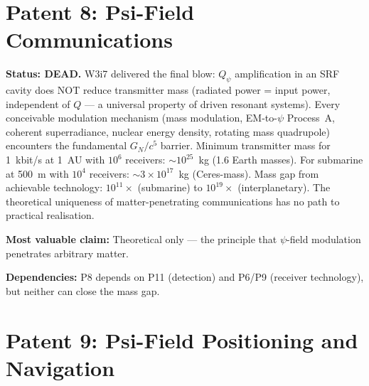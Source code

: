 \documentclass[11pt]{article}
\newcommand{\ee}[1]{\times 10^{#1}}
\begin{document}
\section{Patent 8: Psi-Field Communications}
\label{sec:P8}

\begin{tcolorbox}[colback=red!5!white, colframe=red!60!black,
  title=\textbf{P8: DEAD --- Resource Allocation: 0/5}]
\textbf{Status: DEAD.}
W3i7 delivered the final blow: $Q_\psi$ amplification in an SRF cavity
does NOT reduce transmitter mass (radiated power = input power,
independent of $Q$ --- a universal property of driven resonant systems).
Every conceivable modulation mechanism (mass modulation, EM-to-$\psi$
Process~A, coherent superradiance, nuclear energy density, rotating
mass quadrupole) encounters the fundamental $G_N/c^5$ barrier. Minimum
transmitter mass for 1~kbit/s at 1~AU with $10^6$ receivers:
$\sim 10^{25}$~kg (1.6 Earth masses). For submarine at 500~m with
$10^4$ receivers: $\sim 3\ee{17}$~kg (Ceres-mass). Mass gap from
achievable technology: $10^{11}\times$ (submarine) to $10^{19}\times$
(interplanetary). The theoretical uniqueness of matter-penetrating
communications has no path to practical realisation.

\textbf{Most valuable claim:} Theoretical only --- the principle that
$\psi$-field modulation penetrates arbitrary matter.

\textbf{Dependencies:} P8 depends on P11 (detection) and P6/P9
(receiver technology), but neither can close the mass gap.
\end{tcolorbox}

\section{Patent 9: Psi-Field Positioning and Navigation}
\label{sec:P9}
\end{document}
